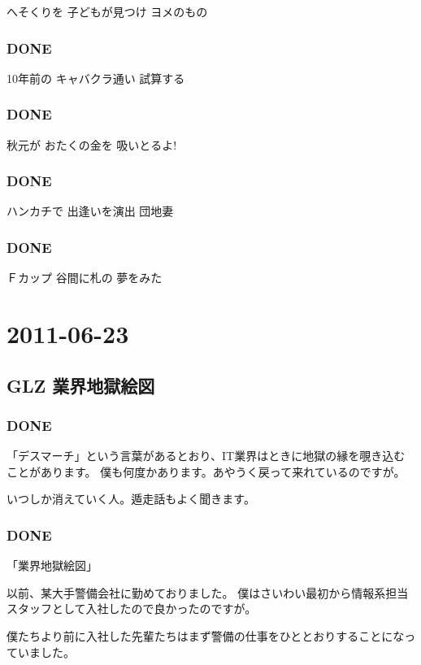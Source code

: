 \documentclass[11pt]{article}
\begin{document}
へそくりを 子どもが見つけ ヨメのもの
\subsubsection{\textbf{DONE}}
\label{sec-103_2_3}

10年前の キャバクラ通い 試算する
\subsubsection{\textbf{DONE}}
\label{sec-103_2_4}

秋元が おたくの金を 吸いとるよ!
\subsubsection{\textbf{DONE}}
\label{sec-103_2_5}

ハンカチで 出逢いを演出 団地妻
\subsubsection{\textbf{DONE}}
\label{sec-103_2_6}

Ｆカップ 谷間に札の 夢をみた
\section{2011-06-23}
\label{sec-104}
\subsection{GLZ 業界地獄絵図}
\label{sec-104_1}
\subsubsection{\textbf{DONE}}
\label{sec-104_1_1}

「デスマーチ」という言葉があるとおり、IT業界はときに地獄の縁を覗き込むことがあります。
僕も何度かあります。あやうく戻って来れているのですが。

いつしか消えていく人。遁走話もよく聞きます。
\subsubsection{\textbf{DONE}}
\label{sec-104_1_2}

「業界地獄絵図」

以前、某大手警備会社に勤めておりました。
僕はさいわい最初から情報系担当スタッフとして入社したので良かったのですが。

僕たちより前に入社した先輩たちはまず警備の仕事をひととおりすることになっていました。
\end{document}
